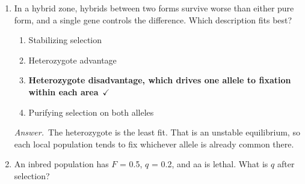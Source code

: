 \documentclass[11pt]{article}
\newcommand{\keyans}[1]{\par\medskip\noindent\textit{Answer.}\ #1\par\medskip}
\begin{document}
\begin{enumerate}[label=\textbf{\arabic*.}, leftmargin=2em, itemsep=1.4em]
\par\smallskip
\begin{enumerate}[label={}, leftmargin=2.4em, labelwidth=0pt, itemsep=2pt, topsep=0pt]
\item \hspace*{-2.4em}\(q\) = freq(a), because a is favored
\item \hspace*{-2.4em}\textbf{\(q\) = freq(A), and every special \(\Delta q\) for A is negative}\ \(\checkmark\)
\item \hspace*{-2.4em}This is heterozygote advantage
\item \hspace*{-2.4em}\(q\) = freq(a), because a is recessive
\end{enumerate}
\keyans{A is the allele selected against, and it is dominant. The course rule makes it \(q\). Lecture 24 slide 8 does exactly this.}
\item In a hybrid zone, hybrids between two forms survive worse than either pure form, and a single gene controls the difference. Which description fits best?
\nopagebreak\par{}
\par\smallskip
\begin{enumerate}[label={}, leftmargin=2.4em, labelwidth=0pt, itemsep=2pt, topsep=0pt]
\item \hspace*{-2.4em}Stabilizing selection
\item \hspace*{-2.4em}Heterozygote advantage
\item \hspace*{-2.4em}\textbf{Heterozygote disadvantage, which drives one allele to fixation within each area}\ \(\checkmark\)
\item \hspace*{-2.4em}Purifying selection on both alleles
\end{enumerate}
\keyans{The heterozygote is the least fit. That is an unstable equilibrium, so each local population tends to fix whichever allele is already common there.}
\item An inbred population has \(F\) = 0.5, \(q\) = 0.2, and aa is lethal. What is \(q\) after selection?

\end{enumerate}
\end{document}
